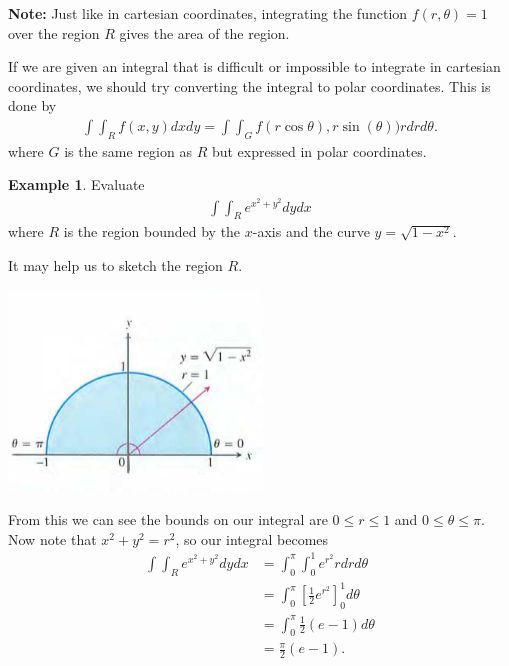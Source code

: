 \documentclass[12pt, letter]{article}
\theoremstyle{plain}
\numberwithin{theorem}{section}
\theoremstyle{definition}
\newtheorem{example}[theorem]{Example}
\begin{document}
\bigskip

\hrulefill

\bigskip

\textbf{Note:} Just like in cartesian coordinates, integrating the function $f(r,\theta) = 1$ over the region $R$ gives the area of the region.

\bigskip

\hrulefill

\bigskip

If we are given an integral that is difficult or impossible to integrate in cartesian coordinates, we should try converting the integral to polar coordinates. This is done by
\begin{align*}
\int \int_R f(x,y)dxdy = \int \int _G f(r\cos\theta),r\sin(\theta)) r dr d\theta.
\end{align*}
where $G$ is the same region as $R$ but expressed in polar coordinates.

\bigskip

\hrulefill

\bigskip

\begin{example}

Evaluate 
\begin{align*}
\int \int_R e^{x^2+y^2} dy dx
\end{align*}
where $R$ is the region bounded by the $x$-axis and the curve $y=\sqrt{1-x^2}$.

\bigskip

It may help us to sketch the region $R$.

\bigskip

\begin{center}
\includegraphics[scale=0.7]{m3_f15}
\end{center}

\bigskip

From this we can see the bounds on our integral are $0\leq r \leq 1$ and $0\leq \theta \leq \pi$. Now note that $x^2+y^2 = r^2$, so our integral becomes
\begin{align*}
\int \int_R e^{x^2+y^2} dydx &= \int_0^\pi \int_0^1 e^{r^2} r dr d\theta\\
&= \int_0^\pi \left[\frac{1}{2}e^{r^2}\right]_0^1 d\theta\\
&= \int_0^\pi \frac{1}{2}(e-1)d\theta\\
&= \frac{\pi}{2}(e-1).
\end{align*}

\end{example}
\end{document}
